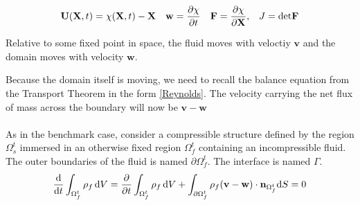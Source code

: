 \begin{align} \mathbf{U}(\mathbf{X},t) = \chi(\mathbf{X},t) - \mathbf{X} & & \mathbf{w} = \frac{\partial \chi}{\partial t} & & \mathbf{F} = \frac{\partial \chi}{\partial \mathbf{X}},& & J = \text{det}\mathbf{F}
\end{align}

Relative to some fixed point in space, the fluid moves with veloctiy $\mathbf{v}$ and the domain moves with velocity $\mathbf{w}$. 









Because the domain itself is moving, we need to recall the balance equation from the Transport Theorem in the form \eqref{Reynolds}. The velocity carrying the net flux of mass across the boundary will now be $\mathbf{v}-\mathbf{w}$
\\
\\
As in the benchmark case, consider a compressible structure defined by the region $\Omega_s^t$ immersed in an otherwise fixed region $\Omega_f^t$ containing an incompressible fluid. The outer boundaries of the fluid is named $\partial \Omega_f^t$. The interface is named $\Gamma$. \\
\begin{align}
\frac{\mathrm{d}}{\mathrm{d}t}\int_{\Omega_f^t} \rho_f \, \mathrm{d}V = \frac{\partial }{\partial t}\int_{\Omega_f^t} \rho_f \, \mathrm{d}V + \int_{\partial \Omega_f^t} \rho_f(\mathbf{v}-\mathbf{w})\cdot \mathbf{n}_{\Omega_f^t} \mathrm{d}S = 0
\end{align}






